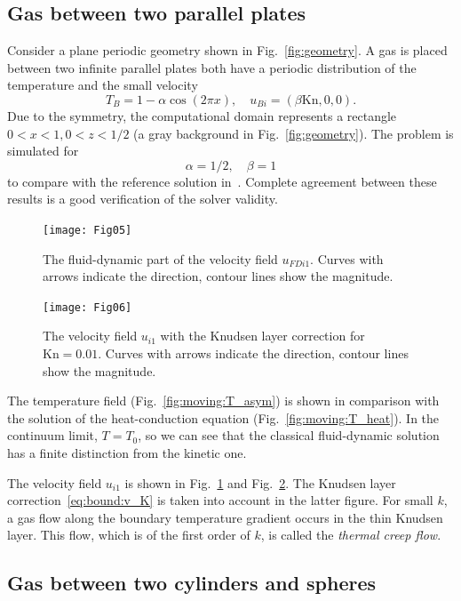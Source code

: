 \documentclass[smallextended, referee]{svjour3} %
\newcommand{\Kn}{\mathrm{Kn}}
\begin{document}
\subsection{Gas between two parallel plates}

Consider a plane periodic geometry shown in Fig.~\ref{fig:geometry}.
A gas is placed between two infinite parallel plates
both have a periodic distribution of the temperature and the small velocity
\begin{equation}
    T_B = 1-\alpha\cos(2\pi x), \quad u_{Bi} = (\beta\Kn,0,0).
\end{equation}
Due to the symmetry, the computational domain represents a rectangle \(0<x<1, 0<z<1/2\)
(a gray background in Fig.~\ref{fig:geometry}).
The problem is simulated for
\[ \alpha=1/2, \quad \beta = 1 \]
to compare with the reference solution in~\cite{SoneBobylev96}.
Complete agreement between these results is a good verification of the solver validity.

\begin{figure}
    \centering
    \texttt{[image: Fig05]}
    \caption{The fluid-dynamic part of the velocity field \(u_{FDi1}\).
        Curves with arrows indicate the direction, contour lines show the magnitude.}
    \label{fig:moving:fluid}
\end{figure}

\begin{figure}
    \centering
    \texttt{[image: Fig06]}
    \caption{The velocity field \(u_{i1}\) with the Knudsen layer correction for \(\Kn=0.01\).
        Curves with arrows indicate the direction, contour lines show the magnitude.}
    \label{fig:moving:kn001}
\end{figure}

The temperature field (Fig.~\ref{fig:moving:T_asym}) is shown
in comparison with the solution of the heat-conduction equation (Fig.~\ref{fig:moving:T_heat}).
In the continuum limit, \(T=T_0\), so we can see that the classical fluid-dynamic solution
has a finite distinction from the kinetic one.

The velocity field \(u_{i1}\) is shown in Fig.~\ref{fig:moving:fluid} and Fig.~\ref{fig:moving:kn001}.
The Knudsen layer correction~\eqref{eq:bound:v_K} is taken into account in the latter figure.
For small \(k\), a gas flow along the boundary temperature gradient occurs
in the thin Knudsen layer. This flow, which is of the first order of \(k\), is called
the \emph{thermal creep flow}.

\subsection{Gas between two cylinders and spheres}
\end{document}

